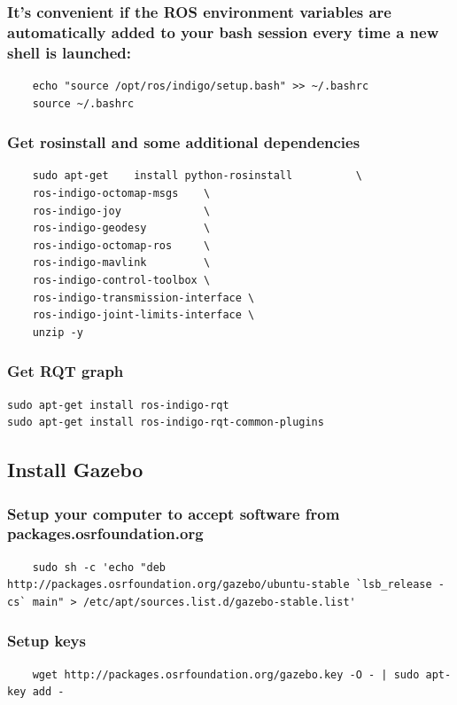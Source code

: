 \documentclass{report}
\begin{document}
\subsubsection{It's convenient if the ROS environment variables are automatically added to your bash session every time a new shell is launched:}
\begin{lstlisting}
	echo "source /opt/ros/indigo/setup.bash" >> ~/.bashrc
	source ~/.bashrc
\end{lstlisting}

\subsubsection{Get rosinstall and some additional dependencies}
\begin{lstlisting}
	sudo apt-get    install python-rosinstall          \
	ros-indigo-octomap-msgs    \
	ros-indigo-joy             \
	ros-indigo-geodesy         \
	ros-indigo-octomap-ros     \
	ros-indigo-mavlink         \
	ros-indigo-control-toolbox \
	ros-indigo-transmission-interface \
	ros-indigo-joint-limits-interface \
	unzip -y
\end{lstlisting}

\subsubsection{Get RQT graph}
\begin{lstlisting}
sudo apt-get install ros-indigo-rqt
sudo apt-get install ros-indigo-rqt-common-plugins
\end{lstlisting}


\subsection{Install Gazebo}
\subsubsection{Setup your computer to accept software from packages.osrfoundation.org}
\begin{lstlisting}
	sudo sh -c 'echo "deb http://packages.osrfoundation.org/gazebo/ubuntu-stable `lsb_release -cs` main" > /etc/apt/sources.list.d/gazebo-stable.list'
\end{lstlisting}

\subsubsection{Setup keys}
\begin{lstlisting}
	wget http://packages.osrfoundation.org/gazebo.key -O - | sudo apt-key add -
\end{lstlisting}
\end{document}
